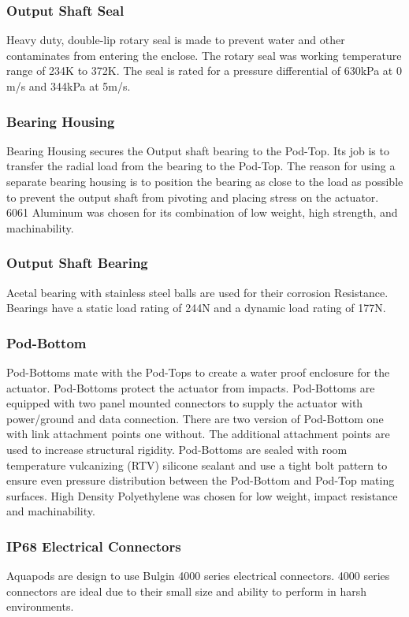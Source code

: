 \subsubsection{Output Shaft Seal}
Heavy duty, double-lip rotary seal is made to prevent water and other contaminates from entering the enclose. The rotary seal was working temperature range of 234K to 372K. The seal is rated for a pressure differential of 630kPa at 0 m/s and 344kPa at 5m/s. 


\subsubsection{Bearing Housing}
Bearing Housing secures the Output shaft bearing to the Pod-Top. Its job is to transfer the radial load from the bearing to the Pod-Top. The reason for using a separate bearing housing is to position the bearing as close to the load as possible to prevent the output shaft from pivoting and placing stress on the actuator.
6061 Aluminum was chosen for its combination of low weight, high strength, and machinability.

\subsubsection{Output Shaft Bearing}
Acetal bearing with stainless steel balls are used for their corrosion Resistance. Bearings have a static load rating of 244N and a dynamic load rating of 177N. 

\subsubsection{Pod-Bottom}
Pod-Bottoms mate with the Pod-Tops to create a water proof enclosure for the actuator. Pod-Bottoms protect the actuator from impacts. Pod-Bottoms are equipped with two panel mounted connectors to supply the actuator with power/ground and data connection. There are two version of Pod-Bottom one with link attachment points one without. The additional attachment points are used to increase structural rigidity. Pod-Bottoms are sealed with room temperature vulcanizing (RTV) silicone sealant and use a tight bolt pattern to ensure even pressure distribution between the Pod-Bottom and Pod-Top mating surfaces.
High Density Polyethylene was chosen for low weight, impact resistance and machinability. 

\subsubsection{IP68 Electrical Connectors}
Aquapods are design to use Bulgin 4000 series electrical connectors. 4000 series connectors are ideal due to their small size and ability to perform in harsh environments.  


